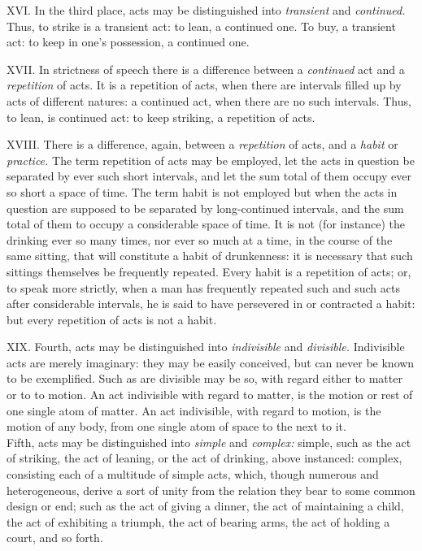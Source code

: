 \documentclass[12pt]{report}
\begin{document}
XVI. In the third place, acts may be distinguished into \emph{transient}
and \emph{continued.} Thus, to strike is a transient act: to lean, a
continued one. To buy, a transient act: to keep in one's possession, a
continued one.

XVII. In strictness of speech there is a difference between a
\emph{continued} act and a \emph{repetition} of acts. It is a repetition
of acts, when there are intervals filled up by acts of different
natures: a continued act, when there are no such intervals. Thus, to
lean, is continued act: to keep striking, a repetition of acts.

XVIII. There is a difference, again, between a \emph{repetition} of
acts, and a \emph{habit} or \emph{practice.} The term repetition of acts
may be employed, let the acts in question be separated by ever such
short intervals, and let the sum total of them occupy ever so short a
space of time. The term habit is not employed but when the acts in
question are supposed to be separated by long-continued intervals, and
the sum total of them to occupy a considerable space of time. It is not
(for instance) the drinking ever so many times, nor ever so much at a
time, in the course of the same sitting, that will constitute a habit of
drunkenness: it is necessary that such sittings themselves be frequently
repeated. Every habit is a repetition of acts; or, to speak more
strictly, when a man has frequently repeated such and such acts after
considerable intervals, he is said to have persevered in or contracted a
habit: but every repetition of acts is not a habit.

XIX. Fourth, acts may be distinguished into \emph{indivisible} and
\emph{divisible.} Indivisible acts are merely imaginary: they may be
easily conceived, but can never be known to be exemplified. Such as are
divisible may be so, with regard either to matter or to to motion. An
act indivisible with regard to matter, is the motion or rest of one
single atom of matter. An act indivisible, with regard to motion, is the
motion of any body, from one single atom of space to the next to it.\\
Fifth, acts may be distinguished into \emph{simple} and \emph{complex:}
simple, such as the act of striking, the act of leaning, or the act of
drinking, above instanced: complex, consisting each of a multitude of
simple acts, which, though numerous and heterogeneous, derive a sort of
unity from the relation they bear to some common design or end; such as
the act of giving a dinner, the act of maintaining a child, the act of
exhibiting a triumph, the act of bearing arms, the act of holding a
court, and so forth.
\end{document}
